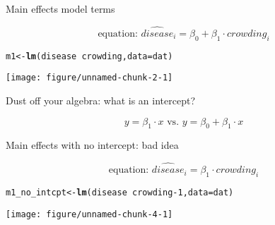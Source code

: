\documentclass[table]{beamer}\usepackage[]{graphicx}\usepackage[]{color}
\makeatletter
\def\maxwidth{ %
  \ifdim\Gin@nat@width>\linewidth
    \linewidth
  \else
    \Gin@nat@width
  \fi
}
\newcommand{\hlnum}[1]{\textcolor[rgb]{0.686,0.059,0.569}{#1}}%
\newcommand{\hlopt}[1]{\textcolor[rgb]{0,0,0}{#1}}%
\newcommand{\hlstd}[1]{\textcolor[rgb]{0.345,0.345,0.345}{#1}}%
\newcommand{\hlkwb}[1]{\textcolor[rgb]{0.69,0.353,0.396}{#1}}%
\newcommand{\hlkwc}[1]{\textcolor[rgb]{0.333,0.667,0.333}{#1}}%
\newcommand{\hlkwd}[1]{\textcolor[rgb]{0.737,0.353,0.396}{\textbf{#1}}}%
\newenvironment{kframe}{%
 \def\at@end@of@kframe{}%
 \ifinner\ifhmode%
  \def\at@end@of@kframe{\end{minipage}}%
  \begin{minipage}{\columnwidth}%
 \fi\fi%
 \def\FrameCommand##1{\hskip\@totalleftmargin \hskip-\fboxsep
 \colorbox{shadecolor}{##1}\hskip-\fboxsep
     \hskip-\linewidth \hskip-\@totalleftmargin \hskip\columnwidth}%
 \MakeFramed {\advance\hsize-\width
   \@totalleftmargin\z@ \linewidth\hsize
   \@setminipage}}%
 {\par\unskip\endMakeFramed%
 \at@end@of@kframe}
\newenvironment{knitrout}{}{} %
\makeatother
\begin{document}

\begin{frame}[fragile]{Main effects model terms}

$$ \mbox{equation: \ }  \widehat{disease}_i = \beta_0 + \beta_1\cdot crowding_i $$

\begin{knitrout}\scriptsize
{}\color{fgcolor}\begin{kframe}
\begin{alltt}
\hlstd{m1} \hlkwb{<-} \hlkwd{lm}\hlstd{(disease} \hlopt{~} \hlstd{crowding,} \hlkwc{data}\hlstd{=dat)}
\end{alltt}
\end{kframe}
\end{knitrout}

\begin{knitrout}\scriptsize
{}\color{fgcolor}
\texttt{[image: figure/unnamed-chunk-2-1]} 
\end{knitrout}


\end{frame}



\begin{frame}[fragile]{Dust off your algebra: what is an intercept?}

$$ y = \beta_1 \cdot x \mbox{\ \ \ \  vs. \ \ \ \ } y = \beta_0 + \beta_1 \cdot x $$

\vspace{12em}


\end{frame}


\begin{frame}[fragile]{Main effects with no intercept: bad idea}

$$ \mbox{equation: \ }  \widehat{disease}_i = \beta_1\cdot crowding_i $$

\begin{knitrout}\scriptsize
{}\color{fgcolor}\begin{kframe}
\begin{alltt}
\hlstd{m1_no_intcpt} \hlkwb{<-} \hlkwd{lm}\hlstd{(disease} \hlopt{~} \hlstd{crowding} \hlopt{-} \hlnum{1}\hlstd{,} \hlkwc{data}\hlstd{=dat)}
\end{alltt}
\end{kframe}
\end{knitrout}


\begin{knitrout}\scriptsize
{}\color{fgcolor}
\texttt{[image: figure/unnamed-chunk-4-1]} 
\end{knitrout}

\end{frame}
\end{document}
